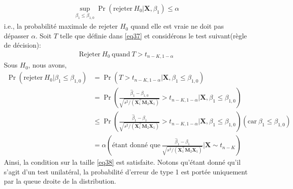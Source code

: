 \begin{align}
\underset{\beta_1\leq\beta_{1,0}}{\sup}\Pr(\textrm{rejeter} \ H_0 | \mathbf{X}, \beta_1) \leq \alpha
\label{eq38}
\end{align}
i.e., la probabilité maximale de rejeter $H_0$ quand elle est vraie ne doit pas dépasser $\alpha$. Soit $T$ telle que définie dans \eqref{eq37} et considérons le test suivant(règle de décision):
\begin{align*}
\textrm{Rejeter}  \ H_0 \ \textrm{quand}  \ T > t_{n-K, 1-\alpha}
\end{align*}
Sous $H_0$, nous avons,
\begin{align*}
\Pr\left(\textrm{rejeter} \ H_0 | \beta_1 \leq \beta_{1,0}  \right)&=\Pr\left(T >  t_{n-K, 1-\alpha} | \mathbf{X}, \beta_1 \leq \beta_{1,0}\right)\\
&=\Pr\left( 
\frac{\widehat{\beta}_1 - \beta_{1,0}}{\sqrt{s^2/(\mathbf{X}_1^\top\mathbf{M}_2\mathbf{X}_1)}} >  t_{n-K, 1-\alpha} | \mathbf{X}, \beta_1 \leq \beta_{1,0}\right)\\
&\leq
\Pr\left( 
\frac{\widehat{\beta}_1 - \beta_1}{\sqrt{s^2/(\mathbf{X}_1^\top\mathbf{M}_2\mathbf{X}_1)}} >  t_{n-K, 1-\alpha} | \mathbf{X}, \beta_1 \leq \beta_{1,0}\right)(\textrm{car}  \  \beta_1 \leq \beta_{1,0})\\
&=\alpha( \textrm{étant donné que} \  \frac{\widehat{\beta}_1 - \beta_1}{\sqrt{s^2/(\mathbf{X}_1^\top\mathbf{M}_2\mathbf{X}_1)}} | \mathbf{X} \sim t_{n-K}  )
\end{align*}
Ainsi, la condition sur la taille \eqref{eq38} est satisfaite. Notons qu'étant donné qu'il s'agit d'un test unilatéral, la probabilité d'erreur de type 1 est portée uniquement par la queue droite de la distribution.
